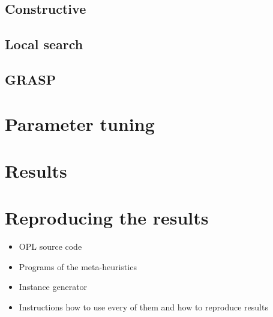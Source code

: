\documentclass[a4paper, 10pt]{article}
\begin{document}
\subsection{Constructive}

\subsection{Local search}

\subsection{GRASP}

\section{Parameter tuning}

\section{Results}

\section{Reproducing the results}

\begin{itemize}
    \item OPL source code
    \item Programs of the meta-heuristics
    \item Instance generator
    \item Instructions how to use every of them and how to reproduce results
\end{itemize}
\end{document}
